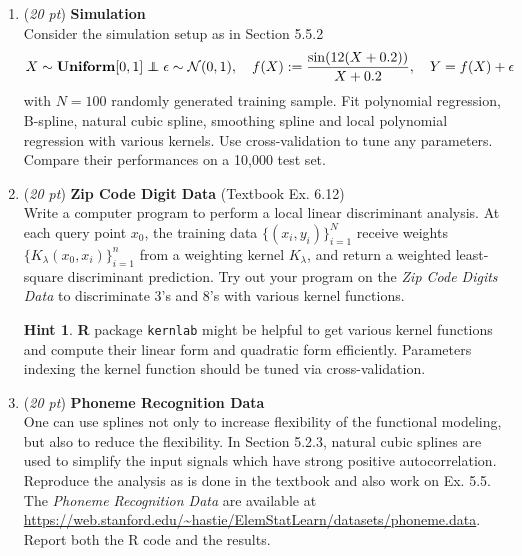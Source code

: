 \documentclass[10pt]{article}
\theoremstyle{definition}
\newtheorem*{hint}{Hint}
\theoremstyle{remark}
\newcommand{\cN}{\mathcal{N}}
\newcommand\indep{\protect\mathpalette{\protect\independenT}{\perp}}
\def\independenT#1#2{\mathrel{\rlap{$#1#2$}\mkern2mu{#1#2}}}	%
\newcommand{\Unif}{\textbf{Uniform}}
\begin{document}
\begin{enumerate}
	\item (\textit{20 pt}) \textbf{Simulation} \\
	Consider the simulation setup as in Section 5.5.2
	\[ X \sim \Unif[0,1] \indep \epsilon \sim \cN(0,1), \quad f(X) := {\sin(12(X+0.2)) \over X+0.2}, \quad Y = f(X) + \epsilon \]
	with $ N = 100 $ randomly generated training sample. Fit polynomial regression, B-spline, natural cubic spline, smoothing spline and local polynomial regression with various kernels. Use cross-validation to tune any parameters. Compare their performances on a 10,000 test set.
	 
	\item (\textit{20 pt}) \textbf{Zip Code Digit Data} (Textbook Ex. 6.12) \\
	Write a computer program to perform a local linear discriminant analysis. At each query point $ x_{0} $, the training data $ \{ (x_{i},y_{i}) \}_{i=1}^{N} $ receive weights $ \{K_{\lambda}(x_{0}, x_{i})\}_{i=1}^{n} $ from a weighting kernel $ K_{\lambda} $, and return a weighted least-square discriminant prediction. Try out your program on the \textit{Zip Code Digits Data} to discriminate 3's and 8's with various kernel functions.
	
	\begin{hint}
		\textbf{R} package \texttt{kernlab} might be helpful to get various kernel functions and compute their linear form and quadratic form efficiently. Parameters indexing the kernel function should be tuned via cross-validation.
	\end{hint}
	
	\item (\textit{20 pt}) \textbf{Phoneme Recognition Data} \\
	One can use splines not only to increase flexibility of the functional modeling, but also to reduce the flexibility. In Section 5.2.3, natural cubic splines are used to simplify the input signals which have strong positive autocorrelation. Reproduce the analysis as is done in the textbook and also work on Ex. 5.5. The \textit{Phoneme Recognition Data} are available at \url{https://web.stanford.edu/~hastie/ElemStatLearn/datasets/phoneme.data}. Report both the R code and the results.
\end{enumerate}



\end{document}
